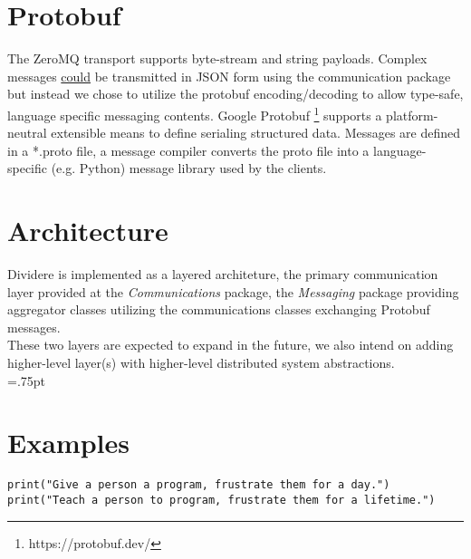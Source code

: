 \documentclass[fontsize=12pt]{book}
\begin{document}
\chapter{Protobuf}
The ZeroMQ transport supports byte-stream and string payloads.  Complex messages \underline{could} be transmitted in JSON form using the communication package but instead we chose to utilize the protobuf encoding/decoding to allow type-safe, language specific messaging contents.  Google Protobuf \footnote{https://protobuf.dev/} supports a platform-neutral extensible means to define serialing structured data.  Messages are defined in a *.proto file, a message compiler converts the proto file into a language-specific (e.g. Python) message library used by the clients.
\\
\chapter{Architecture}

Dividere is implemented as a layered architeture, the primary communication layer provided at the \emph{Communications} package, the \emph{Messaging} package providing aggregator classes utilizing the communications classes exchanging Protobuf messages.  
\\
These two layers are expected to expand in the future, we also intend on adding higher-level layer(s) with higher-level distributed system abstractions.
\\

  {\fboxrule=.75pt%
 }

\chapter{Examples}
\begin{tcolorbox}[title=Python,coltitle=lightgray,width=6in]
\begin{lstlisting}[caption=Joke.py]
print("Give a person a program, frustrate them for a day.")
print("Teach a person to program, frustrate them for a lifetime.")
\end{lstlisting}
\end{tcolorbox}
\end{document}
